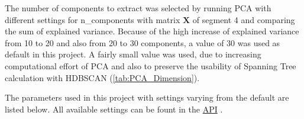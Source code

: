 The number of components to extract was selected by running \gls{PCA} with different settings for \colorbox{backcolour}{n\_components} with matrix $\mathbf{X}$ of segment 4 and comparing the sum of explained variance. Because of the high increase of explained variance from 10 to 20 and also from 20 to 30 components, a value of 30 was used as default in this project. A fairly small value was used, due to increasing computational effort of \gls{PCA} and also to preserve the usability of Spanning Tree calculation with \gls{HDBSCAN} (\autoref{tab:PCA_Dimension}).







The parameters used in this project with settings varying from the default are listed below. All available settings can be fount in the
\href{https://scikit-learn.org/stable/modules/generated/sklearn.decomposition.PCA.html}{API} \autocite{pedregosa_scikit-learn_2011}.


